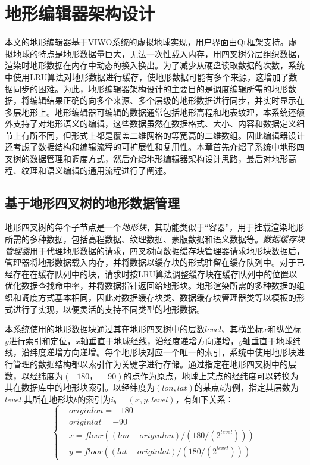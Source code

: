 
\chapter{地形编辑器架构设计}
本文的地形编辑器基于VIWO系统的虚拟地球实现，用户界面由Qt框架支持。虚拟地球的特点是地形数据量巨大，无法一次性载入内存，用四叉树分层组织数据，渲染时地形数据在内存中动态的换入换出。为了减少从硬盘读取数据的次数，系统中使用LRU算法对地形数据进行缓存，使地形数据可能有多个来源，这增加了数据同步的困难。为此，地形编辑器架构设计的主要目的是调度编辑所需的地形数据，将编辑结果正确的向多个来源、多个层级的地形数据进行同步，并实时显示在多层地形上。地形编辑器可编辑的数据通常包括地形高程和地表纹理，本系统还额外支持了对地形语义的编辑，这些数据虽然在数据格式、大小、内容和数据定义细节上有所不同，但形式上都是覆盖二维网格的等宽高的二维数组。因此编辑器设计还考虑了数据结构和编辑流程的可扩展性和复用性。本章首先介绍了系统中地形四叉树的数据管理和调度方式，然后介绍地形编辑器架构设计思路，最后对地形高程、纹理和语义编辑的通用流程进行了阐述。\par
\section{基于地形四叉树的地形数据管理}
地形四叉树的每个子节点是一个\textit{地形块}，其功能类似于“容器”，用于挂载渲染地形所需的多种数据，包括高程数据、纹理数据、蒙版数据和语义数据等。\textit{数据缓存块管理器}用于代理地形数据的请求，四叉树向数据缓存块管理器请求地形块数据后，管理器将地形数据载入内存，并将数据以缓存块的形式驻留在缓存队列中。对于已经存在在缓存队列中的块，请求时按LRU算法调整缓存块在缓存队列中的位置以优化数据查找命中率，并将数据指针返回给地形块。地形渲染所需的多种数据的组织和调度方式基本相同，因此对数据缓存块类、数据缓存块管理器类等以模板的形式进行了实现，以便灵活的支持不同类型的地形数据。\par

本系统使用的地形数据块通过其在地形四叉树中的层数$level$、其横坐标$x$和纵坐标$y$进行索引和定位，$x$轴垂直于地球经线，沿经度递增方向递增，$y$轴垂直于地球纬线，沿纬度递增方向递增。每个地形块对应一个唯一的索引，系统中使用地形块进行管理的数据结构都以索引作为关键字进行存储。通过指定在地形四叉树中的层数，以经纬度为$(-180，-90)$的点作为原点，地球上某点的经纬度可以转换为其在数据库中的地形块索引。以经纬度为$(lon,lat)$的某点$k$为例，指定其层数为$level$,其所在地形块$b$的索引为$i_b=(x,y,level)$，有如下关系：
\begin{equation}
\left\{ \begin{aligned}
&originlon=-180\\
&originlat=-90\\
&x=floor((lon-originlon)/(180/(2^{level})))\\
&y=floor((lat-originlat)/(180/(2^{level})))
\end{aligned}\right.
\end{equation}

